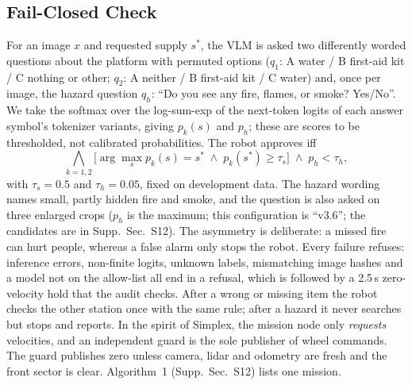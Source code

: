\documentclass[conference]{IEEEtran}
\newcommand{\taus}{\tau_{s}}
\newcommand{\tauh}{\tau_{h}}
\begin{document}
\subsection{Fail-Closed Check}\label{sec:checkpoint}
For an image $x$ and requested supply $s^\ast$, the VLM is asked two differently worded questions about the platform with permuted options ($q_1$: A water / B first-aid kit / C nothing or other; $q_2$: A neither / B first-aid kit / C water) and, once per image, the hazard question $q_h$: ``Do you see any fire, flames, or smoke? Yes/No''. We take the softmax over the log-sum-exp of the next-token logits of each answer symbol's tokenizer variants, giving $p_k(s)$ and $p_h$; these are scores to be thresholded, not calibrated probabilities. The robot approves iff
\begin{equation}
\bigwedge_{k=1,2}\Big[\arg\max_s p_k(s)=s^\ast \;\wedge\; p_k(s^\ast)\ge\taus\Big]\;\wedge\;p_h<\tauh,
\label{eq:rule}\end{equation}
with $\taus=0.5$ and $\tauh=0.05$, fixed on development data. The hazard wording names small, partly hidden fire and smoke, and the question is also asked on three enlarged crops ($p_h$ is the maximum; this configuration is ``v3.6''; the candidates are in Supp.~Sec.~S12).
The asymmetry is deliberate: a missed fire can hurt people, whereas a false alarm only stops the robot. Every failure refuses: inference errors, non-finite logits, unknown labels, mismatching image hashes and a model not on the allow-list all end in a refusal, which is followed by a 2.5\,s zero-velocity hold that the audit checks.
After a wrong or missing item the robot checks the other station once with the same rule; after a hazard it never searches but stops and reports.
In the spirit of Simplex, the mission node only \emph{requests} velocities, and an independent guard is the sole publisher of wheel commands. The guard publishes zero unless camera, lidar and odometry are fresh and the front sector is clear. Algorithm~1 (Supp.~Sec.~S12) lists one mission.
\end{document}
